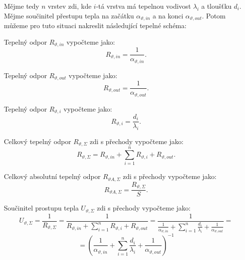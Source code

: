 \documentclass{article}
\begin{document}
Mějme tedy $n$ vrstev zdi, kde $i$-tá vrstva má tepelnou vodivost $\lambda_i$ a tloušťku $d_i$. Mějme součinitel přestupu tepla na začátku $\alpha_{\vartheta,in}$ a na konci $\alpha_{\vartheta,out}$. Potom můžeme pro tuto situaci nakreslit následující tepelné schéma:
\begin{center}
\end{center}

Tepelný odpor $R_{\vartheta,in}$ vypočteme jako:
$$
    R_{\vartheta,in} = \frac{1}{\alpha_{\vartheta,in}}.
$$

Tepelný odpor $R_{\vartheta,out}$ vypočteme jako:
$$
    R_{\vartheta,out} = \frac{1}{\alpha_{\vartheta,out}}.
$$

Tepelný odpor $R_{\vartheta,i}$ vypočteme jako:
$$
    R_{\vartheta,i} = \frac{d_i}{\lambda_i}.
$$

Celkový tepelný odpor $R_{\vartheta,\Sigma}$ zdi s přechody vypočteme jako:
$$
    R_{\vartheta,\Sigma} = R_{\vartheta,in} + \sum_{i=1}^{n} R_{\vartheta,i} + R_{\vartheta,out}.
$$

Celkový absolutní tepelný odpor $R_{\vartheta A,\Sigma}$ zdi s přechody vypočteme jako:
$$
    R_{\vartheta A,\Sigma} = \frac{R_{\vartheta,\Sigma}}{S}.
$$

Součinitel prostupu tepla $U_{\vartheta,\Sigma}$ zdi s přechody vypočteme jako:
$$
    U_{\vartheta,\Sigma} = \frac{1}{R_{\vartheta,\Sigma}} = \frac{1}{R_{\vartheta,in} + \sum_{i=1}^{n} R_{\vartheta,i} + R_{\vartheta,out}} = \frac{1}{\frac{1}{\alpha_{\vartheta,in}} + \sum_{i=1}^{n} \frac{d_i}{\lambda_i} + \frac{1}{\alpha_{\vartheta,out}}} =
$$
$$
    = \left ( \frac{1}{\alpha_{\vartheta,in}} + \sum_{i=1}^{n} \frac{d_i}{\lambda_i} + \frac{1}{\alpha_{\vartheta,out}} \right )^{-1}
$$
\end{document}
